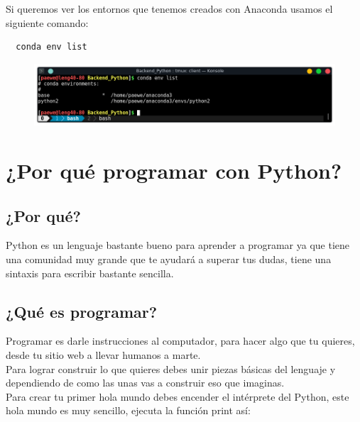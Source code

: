 \documentclass{article}
\begin{document}
Si queremos ver los entornos que tenemos creados con Anaconda usamos el
siguiente comando:

\begin{verbatim}
  conda env list
\end{verbatim}


\begin{figure}[h!]
  \centering
  \includegraphics[scale=0.75]{./Pictures/005_ver_entornos_conda.png}
\end{figure}

\newpage

\section{¿Por qué programar con Python?}%
\subsection{¿Por qué?}%
Python es un lenguaje bastante bueno para aprender a programar ya que tiene una
comunidad muy grande que te ayudará a superar tus dudas, tiene una sintaxis
para escribir bastante sencilla.

\subsection{¿Qué es programar?}%
Programar es darle instrucciones al computador, para hacer algo que tu quieres,
desde tu sitio web a llevar humanos a marte.\\

Para lograr construir lo que quieres debes unir piezas básicas del lenguaje y
dependiendo de como las unas vas a construir eso que imaginas.\\

Para crear tu primer hola mundo debes encender el intérprete del Python, este
hola mundo es muy sencillo, ejecuta la función print así:
\end{document}
